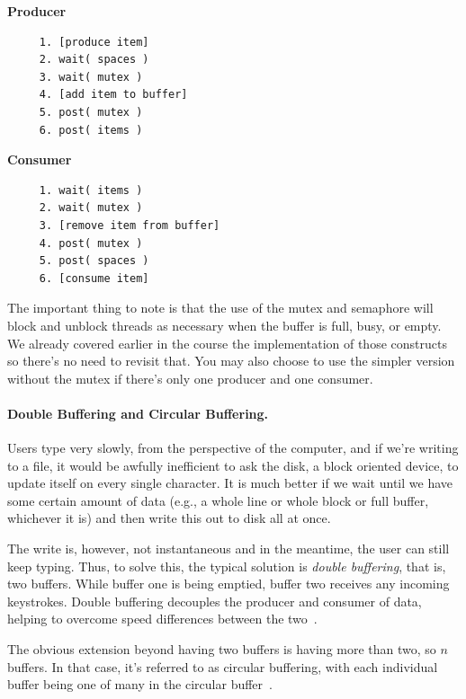 \begin{multicols}{2}
	\textbf{Producer}\vspace{-2em}
	\begin{verbatim}
	 1. [produce item]
	 2. wait( spaces )
	 3. wait( mutex )
	 4. [add item to buffer]
	 5. post( mutex )
	 6. post( items )
  \end{verbatim}
	\columnbreak
	\textbf{Consumer}\vspace{-2em}
	\begin{verbatim}
	 1. wait( items )
	 2. wait( mutex )
	 3. [remove item from buffer]
	 4. post( mutex )
	 5. post( spaces )
	 6. [consume item]
  \end{verbatim}
\end{multicols}
\vspace{-2em}

The important thing to note is that the use of the mutex and semaphore will block and unblock threads as necessary when the buffer is full, busy, or empty. We already covered earlier in the course the implementation of those constructs so there's no need to revisit that. You may also choose to use the simpler version without the mutex if there's only one producer and one consumer.

\paragraph{Double Buffering and Circular Buffering.} Users type very slowly, from the perspective of the computer, and if we're writing to a file, it would be awfully inefficient to ask the disk, a block oriented device, to update itself on every single character. It is much better if we wait until we have some certain amount of data (e.g., a whole line or whole block or full buffer, whichever it is) and then write this out to disk all at once.

The write is, however, not instantaneous and in the meantime, the user can still keep typing. Thus, to solve this, the typical solution is \textit{double buffering}, that is, two buffers. While buffer one is being emptied, buffer two receives any incoming keystrokes. Double buffering decouples the producer and consumer of data, helping to overcome speed differences between the two~\cite{osc}.

The obvious extension beyond having two buffers is having more than two, so $n$ buffers. In that case, it's referred to as circular buffering, with each individual buffer being one of many in the circular buffer~\cite{osi}.


